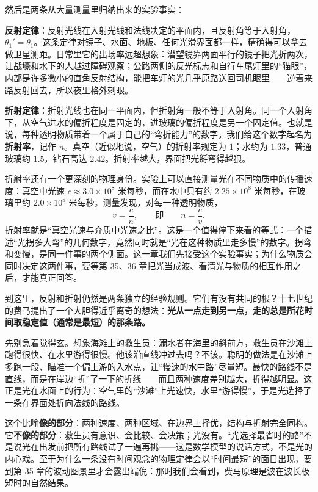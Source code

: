 然后是两条从大量测量里归纳出来的实验事实：

\textbf{反射定律}：反射光线在入射光线和法线决定的平面内，且反射角等于入射角，\(\theta_1'=\theta_1\)。这条定律对镜子、水面、地板、任何光滑界面都一样，精确得可以拿去做卫星测距。日常里它的出场率远超想象：潜望镜靠两面平行的镜子把光折两次，让战壕和水下的人越过障碍观察；公路两侧的反光标志和自行车尾灯里的“猫眼”，内部是许多微小的直角反射结构，能把车灯的光几乎原路送回司机眼里——逆着来路反射回去，所以夜里格外刺眼。

\textbf{折射定律}：折射光线也在同一平面内，但折射角一般不等于入射角。同一个入射角下，从空气进水的偏折程度是固定的，进玻璃的偏折程度是另一个固定值。也就是说，每种透明物质带着一个属于自己的“弯折能力”的数字。我们给这个数字起名为\textbf{折射率}，记作 \(n\)。真空（近似地说，空气）的折射率规定为 \(1\)；水约为 \(1.33\)，普通玻璃约 \(1.5\)，钻石高达 \(2.42\)。折射率越大，界面把光掰弯得越狠。

折射率还有一个更深刻的物理身份。实验上可以直接测量光在不同物质中的传播速度：真空中光速 \(c\approx 3.0\times10^8\) 米每秒，而在水中只有约 \(2.25\times10^8\) 米每秒，在玻璃里约 \(2.0\times10^8\) 米每秒。测量发现，对每一种透明物质，
\[
v=\frac{c}{n},\qquad\text{即}\qquad n=\frac{c}{v}.
\]
折射率就是“真空光速与介质中光速之比”。这是一个值得停下来看的等式：一个描述“光拐多大弯”的几何数字，竟然同时就是“光在这种物质里走多慢”的数字。拐弯和变慢，是同一件事的两个侧面。这一章我们先接受这个实验事实；为什么物质会同时决定这两件事，要等第 35、36 章把光当成波、看清光与物质的相互作用之后，才能真正回答。

到这里，反射和折射仍然是两条独立的经验规则。它们有没有共同的根？十七世纪的费马提出了一个大胆得近乎离奇的想法：\textbf{光从一点走到另一点，走的总是所花时间取稳定值（通常是最短）的那条路。}

先别急着觉得玄。想象海滩上的救生员：溺水者在海里的斜前方，救生员在沙滩上跑得很快、在水里游得很慢。他该沿直线冲过去吗？不该。聪明的做法是在沙滩上多跑一段、瞄准一个偏上游的入水点，让“慢速的水中路”尽量短。最快的路线不是直线，而是在岸边“折”了一下的折线——而且两种速度差别越大，折得越明显。这正是光在水面上的行为：空气里的“沙滩”上光速快，水里“游得慢”，于是光选择了一条在界面处折向法线的路线。

这个比喻\textbf{像的部分}：两种速度、两种区域、在边界上择优，结构与折射完全同构。它\textbf{不像的部分}：救生员有意识、会比较、会决策；光没有。“光选择最省时的路”不是说光在出发前把所有路线试了一遍再挑——这是数学模型的说话方式，不是光的内心戏。至于为什么一条没有时间观念的物理定律会以“时间最短”的面目出现，要到第 35 章的波动图景里才会露出端倪：那时我们会看到，费马原理是波在波长极短时的自然结果。

